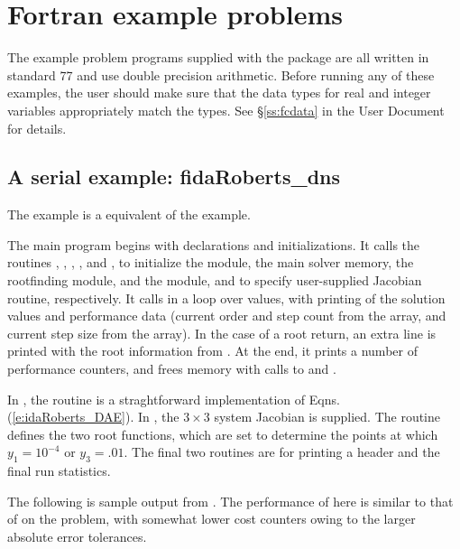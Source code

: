 \section{Fortran example problems}\label{s:ex_fortran}

The {\F} example problem programs supplied with the {\ida}
package are all written in standard {\F}77 and use double precision
arithmetic.  Before running any of these examples, the user should
make sure that the {\F} data types for real and integer variables
appropriately match the {\CC} types.  See \S\ref{ss:fcdata} in the
{\ida} User Document for details.

\subsection{A serial example: fidaRoberts\_dns}\label{ss:fidaRoberts}

The  example is a {\F} equivalent of the
 example.

The main program begins with declarations and initializations.  
It calls the routines , , , 
, and , to initialize the {\nvecs} module, 
the main solver memory, the rootfinding module, and the {\idadense} module, 
and to specify user-supplied Jacobian routine, respectively.
It calls  in a loop over  values, with printing of
the solution values and performance data (current order and step count
from the  array, and current step size from the  array).
In the case of a root return, an extra line is printed with the root
information from .  At the end, it prints a number of
performance counters, and frees memory with calls to 
and .

In , the  routine is a straghtforward
implementation of Eqns. (\ref{e:idaRoberts_DAE}).  In , the 
$3 \times 3$ system Jacobian is supplied.  The  routine
defines the two root functions, which are set to determine the points at which
$y_1 = 10^{-4}$ or $y_3 = .01$.  The final two routines are for
printing a header and the final run statistics.

The following is sample output from .
The performance of {\fida} here is similar to that of {\ida} on
the  problem, with somewhat lower cost counters owing to
the larger absolute error tolerances.

